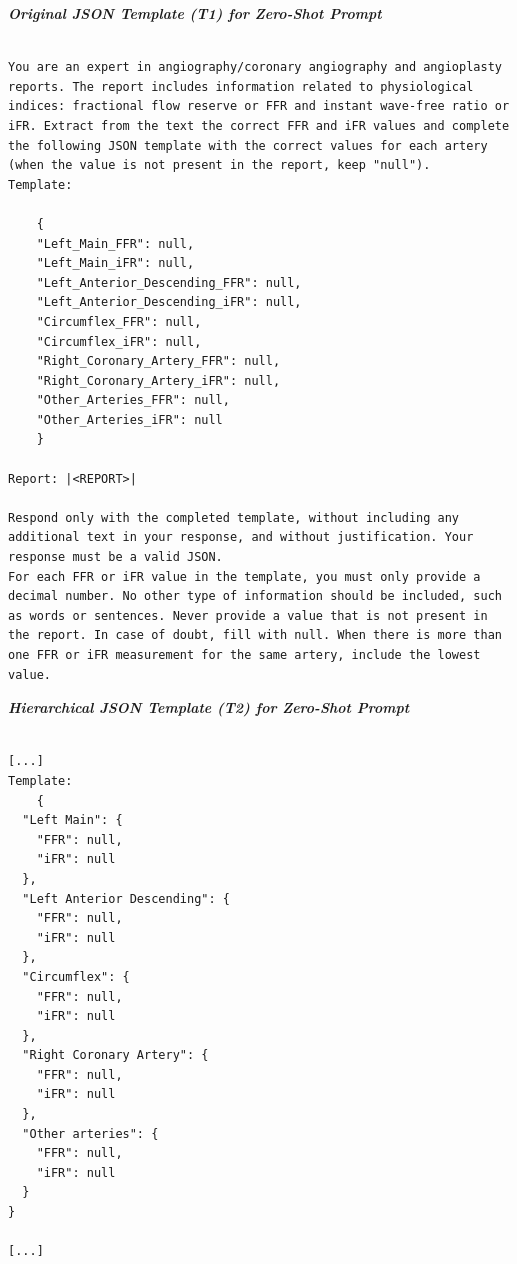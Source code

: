 \begin{center}
\footnotesize 
\begin{minipage}{0.49\textwidth}
\textit{\textbf{Original JSON Template (T1) for Zero-Shot Prompt
}
}
\begin{Verbatim}[breaklines=true, breaksymbolleft={}, breaksymbolright={}]

You are an expert in angiography/coronary angiography and angioplasty reports. The report includes information related to physiological indices: fractional flow reserve or FFR and instant wave-free ratio or iFR. Extract from the text the correct FFR and iFR values and complete the following JSON template with the correct values for each artery (when the value is not present in the report, keep "null"). 
Template:

    {
    "Left_Main_FFR": null,
    "Left_Main_iFR": null,
    "Left_Anterior_Descending_FFR": null,    
    "Left_Anterior_Descending_iFR": null, 
    "Circumflex_FFR": null,
    "Circumflex_iFR": null,
    "Right_Coronary_Artery_FFR": null,
    "Right_Coronary_Artery_iFR": null,
    "Other_Arteries_FFR": null,
    "Other_Arteries_iFR": null
    }
    
Report: |<REPORT>|

Respond only with the completed template, without including any additional text in your response, and without justification. Your response must be a valid JSON.
For each FFR or iFR value in the template, you must only provide a decimal number. No other type of information should be included, such as words or sentences. Never provide a value that is not present in the report. In case of doubt, fill with null. When there is more than one FFR or iFR measurement for the same artery, include the lowest value.

\end{Verbatim}
\end{minipage}
\end{center}



\begin{center}
\footnotesize 
\begin{minipage}{0.45\textwidth}
\textit{\textbf{Hierarchical JSON Template (T2) for Zero-Shot Prompt} }
\begin{Verbatim}[breaklines=true, breaksymbolleft={}, breaksymbolright={}]

[...]
Template:
    {
  "Left Main": {
    "FFR": null,
    "iFR": null
  },
  "Left Anterior Descending": {
    "FFR": null,
    "iFR": null
  },
  "Circumflex": {
    "FFR": null,
    "iFR": null
  },
  "Right Coronary Artery": {
    "FFR": null,
    "iFR": null
  },
  "Other arteries": {
    "FFR": null,
    "iFR": null
  }
}

[...]

\end{Verbatim}
\end{minipage}
\end{center}



